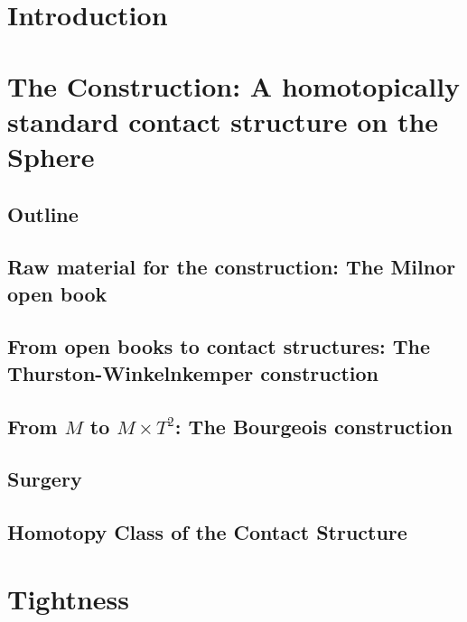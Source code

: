 \documentclass[oneside]{amsbook}
\begin{document}
\tableofcontents

\chapter{Introduction}


\chapter[Construction]{The Construction: A homotopically standard contact structure on the Sphere}\label{chap:construction}
\section{Outline}

\section[The Milnor open book]{Raw material for the construction: The Milnor open book} \label{sec:milnor}

\section[The Thurston-Winkelnkemper-construction]{From open books to contact structures: The Thurston-Winkelnkemper construction}

\section[The Bourgeois construction]{From \texorpdfstring{$M$}{M} to \texorpdfstring{$M \times T^2$}{M x T2}: The Bourgeois construction}


\section{Surgery}



\section[Homotopically standard]{Homotopy Class of the Contact Structure} \label{homotopically_standard}


\chapter{Tightness}\label{chap:tightness}

\end{document}
